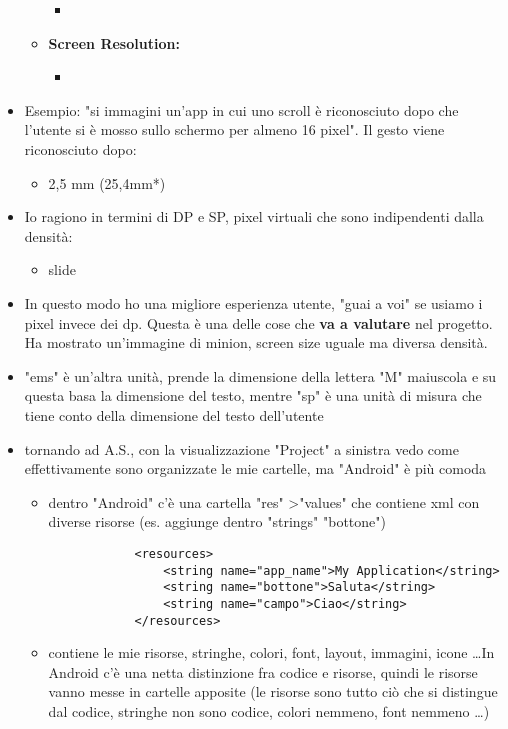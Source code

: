 \begin{itemize}
\begin{itemize}
        \begin{itemize}
            \item 
        \end{itemize}
        \item \textbf{Screen Resolution:}
        \begin{itemize}
            \item 
        \end{itemize}
    \end{itemize}
    \item Esempio: "si immagini un'app in cui uno scroll è riconosciuto dopo che l'utente si è mosso sullo schermo per almeno 16 pixel". Il gesto viene riconosciuto dopo:
    \begin{itemize}
        \item 2,5 mm (25,4mm*)
    \end{itemize}
    \item Io ragiono in termini di DP e SP, pixel virtuali che sono indipendenti dalla densità:
    \begin{itemize}
        \item slide
    \end{itemize}
    \item In questo modo ho una migliore esperienza utente, "guai a voi" se usiamo i pixel invece dei dp. Questa è una delle cose che \textbf{va a valutare} nel progetto. Ha mostrato un'immagine di minion, screen size uguale ma diversa densità.
    \item "ems" è un'altra unità, prende la dimensione della lettera "M" maiuscola e su questa basa la dimensione del testo, mentre "sp" è una unità di misura che tiene conto della dimensione del testo dell'utente
    \item tornando ad A.S., con la visualizzazione "Project" a sinistra vedo come effettivamente sono organizzate le mie cartelle, ma "Android" è più comoda
    \begin{itemize}
        \item dentro "Android" c'è una cartella "res" \textgreater "values" che contiene xml con diverse risorse (es. aggiunge dentro "strings" "bottone")
        \begin{verbatim}
            <resources>
                <string name="app_name">My Application</string>
                <string name="bottone">Saluta</string>
                <string name="campo">Ciao</string>
            </resources>
        \end{verbatim}
        \item contiene le mie risorse, stringhe, colori, font, layout, immagini, icone \dots In Android c'è una netta distinzione fra codice e risorse, quindi le risorse vanno messe in cartelle apposite (le risorse sono tutto ciò che si distingue dal codice, stringhe non sono codice, colori nemmeno, font nemmeno \dots)

\end{itemize}
\end{itemize}
